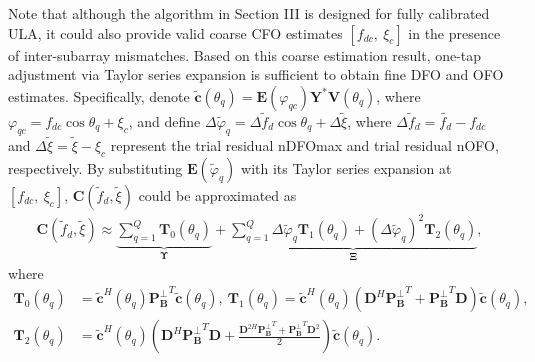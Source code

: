 \documentclass[12pt, draftclsnofoot, onecolumn]{IEEEtran}
\begin{document}
Note that although the algorithm in Section III is designed for fully calibrated ULA, it could also provide valid coarse CFO estimates $\left[ {{f}_{dc}}, \ {{\xi }_{c}} \right]$ in the presence of inter-subarray mismatches. Based on this coarse estimation result, one-tap adjustment via Taylor series expansion is sufficient to obtain fine DFO and OFO estimates. Specifically, denote $\mathbf{\tilde{c}}\left( {{\theta }_{q}} \right)=\mathbf{E}\left( {\varphi}_{qc} \right){{\mathbf{Y}}^{*}}\mathbf{V}\left( {{\theta }_{q}} \right)$, where ${\varphi}_{qc} = f_{dc} \cos{{\theta }_{q}} + \xi_c$, and define $\Delta {\tilde{\varphi}_{q}} = \Delta \tilde f_{d} \cos{{\theta }_{q}} + \Delta \tilde\xi$, where $\Delta \tilde f_{d} = \tilde{f_d} - f_{dc}$ and $\Delta \tilde\xi = \tilde{\xi} - \xi_c$ represent the trial residual nDFOmax and trial residual nOFO, respectively. By substituting $\mathbf{E }\left( {{\tilde{\varphi}}}_{q} \right)$ with its Taylor series expansion at $\left[ {{f}_{dc}}, \ {{\xi }_{c}} \right]$, $\mathbf{C}\left( {{{\tilde{f}}}_{d}}, \tilde{\xi } \right)$ could be approximated as
\begin{align}
\mathbf{C} \left( {{{\tilde{f}}}_{d}}, \tilde{\xi } \right) \approx \underbrace{ \sum\limits_{q=1}^{Q}{ {{\mathbf{T}}_{0}}\left( {{\theta }_{q}} \right) }}_{\mathbf{\Upsilon}} + \underbrace{\sum\limits_{q=1}^{Q}{ \Delta {\tilde{\varphi}_{q}}  {{\mathbf{T}}_{1}}\left( {{\theta }_{q}} \right)+{{\left( \Delta {\tilde{\varphi}_{q}} \right)}^{2}}{{\mathbf{T}}_{2}}\left( {{\theta }_{q}} \right) }}_{\mathbf{\Xi}},
\end{align}
where
\begin{align*}
  {{\mathbf{T}}_{0}}\left( {{\theta }_{q}} \right) &={{{\mathbf{\tilde{c}}}}^{H}}\left( {{\theta }_{q}} \right) {\mathbf{P}_{\mathbf{B}}^{\bot }}^{T}  \mathbf{\tilde{c}}\left( {{\theta }_{q}} \right), \
{{\mathbf{T}}_{1}}\left( {{\theta }_{q}} \right) ={{{\mathbf{\tilde{c}}}}^{H}}\left( {{\theta }_{q}} \right) \left( {{\mathbf{D}}^{H}}{{\mathbf{P}_{\mathbf{B}}^{\bot } }^{T}} + {{ \mathbf{P}_{\mathbf{B}}^{\bot } }^{T}}\mathbf{D} \right) \mathbf{\tilde{c}}\left( {{\theta }_{q}} \right), \\
 {{\mathbf{T}}_{2}}\left( {{\theta }_{q}} \right)&= {{{\mathbf{\tilde{c}}}}^{H}}\left( {{\theta }_{q}} \right) \left( {{\mathbf{D}}^{H}}{{ \mathbf{P}_{\mathbf{B}}^{\bot } }^{T}}\mathbf{D} + \frac{ {{\mathbf{D}}^{2H}}{{ \mathbf{P}_{\mathbf{B}}^{\bot }}^{T}} + {{ \mathbf{P}_{\mathbf{B}}^{\bot } }^{T}}{{\mathbf{D}}^{2}}}{2} \right) \mathbf{\tilde{c}}\left( {{\theta }_{q}} \right).
\end{align*}
\end{document}
